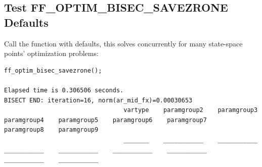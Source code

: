 \documentclass[
]{book}
\begin{document}
\hypertarget{test-ff_optim_bisec_savezrone-defaults}{%
\subsection{Test FF\_OPTIM\_BISEC\_SAVEZRONE Defaults}\label{test-ff_optim_bisec_savezrone-defaults}}

Call the function with defaults, this solves concurrently for many
state-space points' optimization problems:

\begin{verbatim}
ff_optim_bisec_savezrone();

Elapsed time is 0.306506 seconds.
BISECT END: iteration=16, norm(ar_mid_fx)=0.00030653
                                 vartype    paramgroup2    paramgroup3    paramgroup4    paramgroup5    paramgroup6    paramgroup7    paramgroup8    paramgroup9
                                 _______    ___________    ___________    ___________    ___________    ___________    ___________    ___________    ___________


\end{verbatim}
\end{document}
